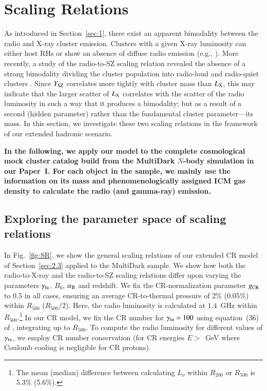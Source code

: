 \documentclass[useAMS,usenatbib]{mn2e}
\begin{document}
\section{Scaling Relations}
\label{sec:4}
As introduced in Section~\ref{sec:1}, there exist an apparent bimodality between
the radio and X-ray cluster emission. Clusters with a given X-ray luminosity can
either host RHs or show an absence of diffuse radio emission (e.g.,
\citealp{2009A&A...507..661B,2011A&A...527A..99E}). More recently, a study of
the radio-to-SZ scaling relation revealed the absence of a strong bimodality
dividing the cluster population into radio-loud and radio-quiet clusters
\citep{2012MNRAS.421L.112B,2013arXiv1306.4379C,2013arXiv1307.3049S}. 
Since $Y_{{\mathrm{SZ}}}$ correlates more tightly with
cluster mass than $L_{{\mathrm{X}}}$, this may indicate that the larger scatter of
$L_{{\mathrm{X}}}$ correlates with the scatter of the radio luminosity in such a way
that it produces a bimodality; but as a result of a second (hidden parameter)
rather than the fundamental cluster parameter---its mass. In this section, we 
investigate these two scaling relations in the framework of our extended 
hadronic scenario. 

{\bf In the following, we apply our model to the complete
cosmological mock cluster catalog build from the MultiDark $N$-body 
simulation in our Paper~I. For each object in the sample, we mainly use
the information on its mass and phenomenologically assigned 
ICM gas density to calculate the radio (and gamma-ray) emission.}


\subsection{Exploring the parameter space of scaling relations}

In Fig.~\ref{fig:SR}, we show the general scaling relations of our extended CR
model of Section~\ref{sec:2.3} applied to the MultiDark sample. We show how both
the radio-to-X-ray and the radio-to-SZ scaling relations differ upon varying the
parameters $\gamma_{{\mathrm{tu}}}$, $B_{0}$, $\alpha_{{\mathrm{B}}}$ and redshift. We fix
the CR-normalization parameter $g_{{\mathrm{CR}}}$ to 0.5 in all cases, ensuring an
average CR-to-thermal pressure of $2\%$ ($0.05\%$) within $R_{500}$
($R_{500}/2$). Here, the radio luminosity is calculated at $1.4$~GHz within
$R_{500}.$\footnote{The mean (median) difference between calculating $L_{\nu}$
  within $R_{200}$ or $R_{500}$ is 5.3\% (5.6\%).}  In our CR model, we fix the
CR number for $\gamma_{{\mathrm{tu}}}=100$ using equation~(36) of
\cite{2011A&A...527A..99E}, integrating up to $R_{500}$. To compute the radio
luminosity for different values of $\gamma_{{\mathrm{tu}}}$, we employ CR number
conservation (for CR energies $E>$~GeV where Coulomb cooling is negligible for CR
protons).
\end{document}
